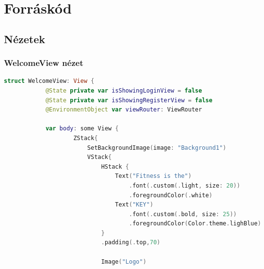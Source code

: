 \chapter*{Forráskód}
\section*{Nézetek} 
\subsection*{WelcomeView nézet}
\begin{spacing}{2}
\end{spacing}

\begin{minipage}{\textwidth}
    \linespread{0.8}\selectfont
    \begin{lstlisting}[language=swift]
        struct WelcomeView: View {
            @State private var isShowingLoginView = false
            @State private var isShowingRegisterView = false
            @EnvironmentObject var viewRouter: ViewRouter
            
            var body: some View {
                    ZStack{
                        SetBackgroundImage(image: "Background1")
                        VStack{
                            HStack {
                                Text("Fitness is the")
                                    .font(.custom(.light, size: 20))
                                    .foregroundColor(.white)
                                Text("KEY")
                                    .font(.custom(.bold, size: 25))
                                    .foregroundColor(Color.theme.lighBlue)
                            }
                            .padding(.top,70)
                      
                            Image("Logo")
                           

\end{lstlisting}
\end{minipage}
